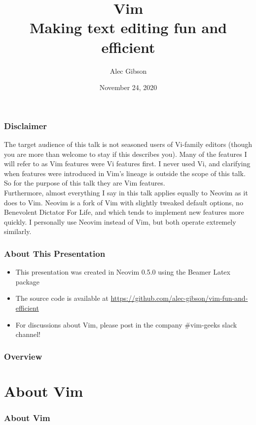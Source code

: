 \documentclass{beamer}
\title[\textcolor{white}{Vim - Fun and Efficient}]{\huge Vim \\
    \large Making text editing fun and efficient
}
\author{Alec Gibson}
\institute[BlueCat]
{
    BlueCat Networks \\
    \medskip
    \textit{agibson@bluecatnetworks.com}
}
\date{November 24, 2020}
\begin{document}
\begin{frame}
    \titlepage %
\end{frame}

\begin{frame}
    \frametitle{Disclaimer}
    \small The target audience of this talk is not seasoned users of Vi-family editors (though you are more than welcome to stay if this describes you). Many of the features I will refer to as Vim features were Vi features first. I never used Vi, and clarifying when features were introduced in Vim's lineage is outside the scope of this talk. So for the purpose of this talk they are Vim features.\\
    \vspace{0.5cm}
    Furthermore, almost everything I say in this talk applies equally to Neovim as it does to Vim. Neovim is a fork of Vim with slightly tweaked default options, no Benevolent Dictator For Life, and which tends to implement new features more quickly. I personally use Neovim instead of Vim, but both operate extremely similarly.
\end{frame}

\begin{frame}
    \frametitle{About This Presentation}
    \begin{itemize}
	\item This presentation was created in Neovim 0.5.0 using the Beamer Latex package
	\item The source code is available at \url{https://github.com/alec-gibson/vim-fun-and-efficient}
	\item For discussions about Vim, please post in the company \#vim-geeks slack channel!
    \end{itemize}
\end{frame}

\begin{frame}
    \frametitle{Overview}
    \tableofcontents
\end{frame}

\section{About Vim}

\begin{frame}
    \frametitle{About Vim}
    \tableofcontents[currentsection]
\end{frame}
\end{document}
